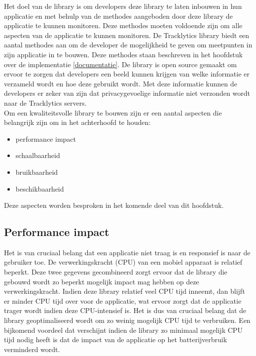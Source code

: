 \noindent Het doel van de library is om developers deze library te laten inbouwen in hun applicatie en met behulp van de methodes aangeboden door deze library de applicatie te kunnen monitoren. Deze methodes moeten voldoende zijn om alle aspecten van de applicatie te kunnen monitoren. De Tracklytics library biedt een aantal methodes aan om de developer de mogelijkheid te geven om meetpunten in zijn applicatie in te bouwen. Deze methodes staan beschreven in het hoofdstuk over de implementatie \ref{documentatie}. De library is open source gemaakt om ervoor te zorgen dat developers een beeld kunnen krijgen van welke informatie er verzameld wordt en hoe deze gebruikt wordt. Met deze informatie kunnen de developers er zeker van zijn dat privacygevoelige informatie niet verzonden wordt naar de Tracklytics servers.\\

Om een kwaliteitsvolle library te bouwen zijn er een aantal aspecten die belangrijk zijn om in het achterhoofd te houden:
\begin{itemize}
\item performance impact
\item schaalbaarheid
\item bruikbaarheid
\item beschikbaarheid
\end{itemize}

Deze aspecten worden besproken in het komende deel van dit hoofdstuk. 

\subsection{Performance impact}
Het is van cruciaal belang dat een applicatie niet traag is en responsief is naar de gebruiker toe. De verwerkingskracht (CPU) van een mobiel apparaat is relatief beperkt. Deze twee gegevens gecombineerd zorgt ervoor dat de library die gebouwd wordt zo beperkt mogelijk impact mag hebben op deze verwerkingskracht. Indien deze library relatief veel CPU tijd inneemt, dan blijft er minder CPU tijd over voor de applicatie, wat ervoor zorgt dat de applicatie trager wordt indien deze CPU-intensief is. Het is dus van cruciaal belang dat de library geoptimaliseerd wordt om zo weinig mogelijk CPU tijd te verbruiken. Een bijkomend voordeel dat verschijnt indien de library zo minimaal mogelijk CPU tijd nodig heeft is dat de impact van de applicatie op het batterijverbruik verminderd wordt.  \\

